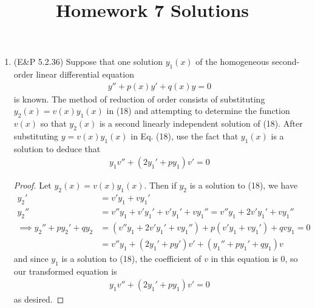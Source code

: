 \documentclass{article}
\begin{document}
\title{Homework 7 Solutions}
\maketitle
\thispagestyle{fancy}

\begin{enumerate}
	\item (E\&P 5.2.36) Suppose that one solution $y_1(x)$ of the homogeneous second-order linear differential equation
		\begin{align*}
			y''+p(x)y'+q(x)y=0 \tag{18}
		\end{align*}
		is known. The method of reduction of order consists of substituting $y_2(x)=v(x)y_1(x)$ in (18) and attempting to determine the function $v(x)$ so that $y_2(x)$ is a second linearly independent solution of (18). After substituting $y=v(x)y_1(x)$ in Eq. (18), use the fact that $y_1(x)$ is a solution to deduce that
		\begin{align*}
			y_1v''+(2y_1'+py_1)v'=0\tag{19}
		\end{align*}
		\begin{proof}
			Let $y_2(x)=v(x)y_1(x).$ Then if $y_2$ is a solution to (18), we have
			\begin{align*}
				y_2' &= v'y_1 + vy_1' \\
				y_2'' &= v''y_1 + v'y_1' + v'y_1' + vy_1'' = v''y_1 + 2v'y_1'+vy_1'' \\ 
				\implies y_2'' + py_2' + qy_2 &= (v''y_1+2v'y_1' + vy_1'') + p(v'y_1+vy_1') + qvy_1 = 0 \\
				&= v''y_1 + (2y_1'+py')v' + (y_1'' + py_1' + qy_1)v 
			\end{align*}
			and since $y_1$ is a solution to (18), the coefficient of $v$ in this equation is 0, so our transformed equation is
			\begin{align*}
				y_1v'' + (2y_1' + py_1)v' = 0
			\end{align*}
			as desired.
		\end{proof}


\end{enumerate}
\end{document}
